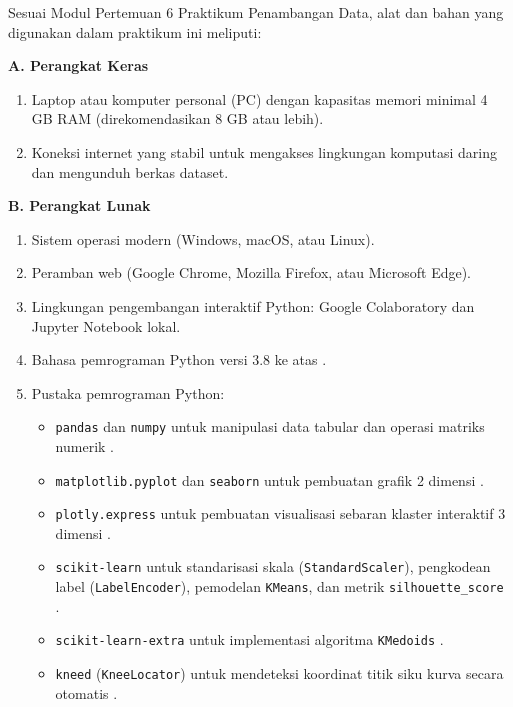 \documentclass[a4paper,oneside,12pt]{report}
\begin{document}
Sesuai Modul Pertemuan 6 Praktikum Penambangan Data, alat dan bahan yang digunakan dalam praktikum ini meliputi:

\vspace{0.2cm}
\noindent\textbf{A. Perangkat Keras}
\begin{enumerate}[noitemsep, topsep=2pt, parsep=1pt]
    \item Laptop atau komputer personal (PC) dengan kapasitas memori minimal 4 GB RAM (direkomendasikan 8 GB atau lebih).
    \item Koneksi internet yang stabil untuk mengakses lingkungan komputasi daring dan mengunduh berkas dataset.
\end{enumerate}

\vspace{0.2cm}
\noindent\textbf{B. Perangkat Lunak}
\begin{enumerate}[noitemsep, topsep=2pt, parsep=1pt]
    \item Sistem operasi modern (Windows, macOS, atau Linux).
    \item Peramban web (Google Chrome, Mozilla Firefox, atau Microsoft Edge).
    \item Lingkungan pengembangan interaktif Python: Google Colaboratory dan Jupyter Notebook lokal.
    \item Bahasa pemrograman Python versi 3.8 ke atas \cite{python-docs}.
    \item Pustaka pemrograman Python:
    \begin{itemize}[noitemsep, topsep=1pt, parsep=0.5pt]
        \item \texttt{pandas} dan \texttt{numpy} untuk manipulasi data tabular dan operasi matriks numerik \cite{pandas-docs,numpy-docs}.
        \item \texttt{matplotlib.pyplot} dan \texttt{seaborn} untuk pembuatan grafik 2 dimensi \cite{matplotlib-docs,seaborn-docs}.
        \item \texttt{plotly.express} untuk pembuatan visualisasi sebaran klaster interaktif 3 dimensi \cite{plotly-docs}.
        \item \texttt{scikit-learn} untuk standarisasi skala (\texttt{StandardScaler}), pengkodean label (\texttt{LabelEncoder}), pemodelan \texttt{KMeans}, dan metrik \texttt{silhouette\_score} \cite{sklearn-clustering,sklearn-scaler,sklearn-encoder}.
        \item \texttt{scikit-learn-extra} untuk implementasi algoritma \texttt{KMedoids} \cite{sklearn-extra-kmedoids}.
        \item \texttt{kneed} (\texttt{KneeLocator}) untuk mendeteksi koordinat titik siku kurva secara otomatis \cite{kneed-docs}.
    \end{itemize}
\end{enumerate}
\end{document}
